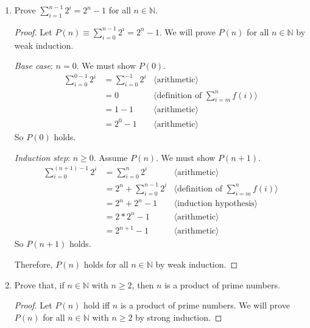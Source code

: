 \documentclass[11pt,fleqn]{article}
\newcommand{\pnote}[1]{{\langle \text{#1} \rangle}}
\begin{document}
\begin{enumerate}

  \item Prove $\sum^{n-1}_{i=1}2^i = 2^n - 1$ for all $n \in
    \mathbb{N}$.

\begin{proof}
Let $P(n) \equiv \sum^{n-1}_{i=0}2^i = 2^n - 1$.  We will prove $P(n)$
for all $n \in \mathbb{N}$ by weak induction.

\medskip

\emph{Base case}: $n = 0$.  We must show $P(0)$.
\begin{align*}
  \sum_{i=0}^{0-1} 2^{i}
  &= \sum^{-1}_{i = 0} 2^i & \pnote{arithmetic}\\
  &= 0                    & \pnote{definition of $\textstyle{\sum}_{i=m}^{n} f(i)$}\\
  &= 1 - 1                & \pnote{arithmetic}\\
  &= 2^0 - 1              & \pnote{arithmetic}
\end{align*}
So $P(0)$ holds.

\medskip

\emph{Induction step}: $n \ge 0$. Assume $P(n)$. We must show $P(n + 1)$.
\begin{align*}
  \sum_{i=0}^{(n + 1) - 1} 2^i
  &= \sum_{i=0}^{n} 2^{i}       & \pnote{arithmetic}\\
  &= 2^n + \sum_{i=0}^{n-1} 2^i & \pnote{definition of $\textstyle{\sum}_{i=m}^{n} f(i)$}\\
  &= 2^n + 2^n - 1             & \pnote{induction hypothesis}\\
  &= 2*2^n - 1                 & \pnote{arithmetic}\\
  &= 2^{n+1} - 1               & \pnote{arithmetic}
\end{align*}
So $P(n + 1)$ holds.

\medskip

Therefore, $P(n)$ holds for all $n \in \mathbb{N}$ by weak induction.
\end{proof}

\newpage

  \item Prove that, if $n \in \mathbb{N}$ with $n \ge 2$, then $n$ is
    a product of prime numbers.

\begin{proof}
Let $P(n)$ hold iff $n$ is a product of prime numbers.  We will prove
$P(n)$ for all $n \in \mathbb{N}$ with $n \ge 2$ by strong induction.

\medskip


\end{proof}
\end{enumerate}
\end{document}
